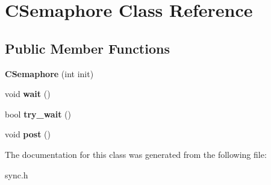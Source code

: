 \hypertarget{class_c_semaphore}{}\section{C\+Semaphore Class Reference}
\label{class_c_semaphore}
\subsection*{Public Member Functions}
\begin{DoxyCompactItemize}
\item 
\mbox{\label{class_c_semaphore_ac9cc749c7424852d7fb4378811d0dae1}} 
{\bfseries C\+Semaphore} (int init)
\item 
\mbox{\label{class_c_semaphore_a1c108bd981fe68527ec8ef5e7b0d116c}} 
void {\bfseries wait} ()
\item 
\mbox{\label{class_c_semaphore_abb8a07e6cac29dc72f044cd536a9f9e5}} 
bool {\bfseries try\+\_\+wait} ()
\item 
\mbox{\label{class_c_semaphore_af6a956f6c191e824485fd3af6db39318}} 
void {\bfseries post} ()
\end{DoxyCompactItemize}


The documentation for this class was generated from the following file\+:\begin{DoxyCompactItemize}
\item 
sync.\+h\end{DoxyCompactItemize}
